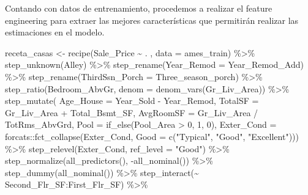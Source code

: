 \documentclass[
]{book}
\newenvironment{Shaded}{\begin{snugshade}}{\end{snugshade}}
\newcommand{\AttributeTok}[1]{\textcolor[rgb]{0.77,0.63,0.00}{#1}}
\newcommand{\DecValTok}[1]{\textcolor[rgb]{0.00,0.00,0.81}{#1}}
\newcommand{\FunctionTok}[1]{\textcolor[rgb]{0.00,0.00,0.00}{#1}}
\newcommand{\NormalTok}[1]{#1}
\newcommand{\OtherTok}[1]{\textcolor[rgb]{0.56,0.35,0.01}{#1}}
\newcommand{\SpecialCharTok}[1]{\textcolor[rgb]{0.00,0.00,0.00}{#1}}
\newcommand{\StringTok}[1]{\textcolor[rgb]{0.31,0.60,0.02}{#1}}
\begin{document}
Contando con datos de entrenamiento, procedemos a realizar el feature engineering para extraer las mejores características que permitirán realizar las estimaciones en el modelo.

\begin{Shaded}
\begin{Highlighting}[]
\NormalTok{receta\_casas }\OtherTok{\textless{}{-}} \FunctionTok{recipe}\NormalTok{(Sale\_Price }\SpecialCharTok{\textasciitilde{}}\NormalTok{ . , }\AttributeTok{data =}\NormalTok{ ames\_train) }\SpecialCharTok{\%\textgreater{}\%}
  \FunctionTok{step\_unknown}\NormalTok{(Alley) }\SpecialCharTok{\%\textgreater{}\%}
  \FunctionTok{step\_rename}\NormalTok{(}\AttributeTok{Year\_Remod =}\NormalTok{ Year\_Remod\_Add) }\SpecialCharTok{\%\textgreater{}\%} 
  \FunctionTok{step\_rename}\NormalTok{(}\AttributeTok{ThirdSsn\_Porch =}\NormalTok{ Three\_season\_porch) }\SpecialCharTok{\%\textgreater{}\%} 
  \FunctionTok{step\_ratio}\NormalTok{(Bedroom\_AbvGr, }\AttributeTok{denom =} \FunctionTok{denom\_vars}\NormalTok{(Gr\_Liv\_Area)) }\SpecialCharTok{\%\textgreater{}\%} 
  \FunctionTok{step\_mutate}\NormalTok{(}
    \AttributeTok{Age\_House =}\NormalTok{ Year\_Sold }\SpecialCharTok{{-}}\NormalTok{ Year\_Remod,}
    \AttributeTok{TotalSF   =}\NormalTok{ Gr\_Liv\_Area }\SpecialCharTok{+}\NormalTok{ Total\_Bsmt\_SF,}
    \AttributeTok{AvgRoomSF   =}\NormalTok{ Gr\_Liv\_Area }\SpecialCharTok{/}\NormalTok{ TotRms\_AbvGrd,}
    \AttributeTok{Pool =} \FunctionTok{if\_else}\NormalTok{(Pool\_Area }\SpecialCharTok{\textgreater{}} \DecValTok{0}\NormalTok{, }\DecValTok{1}\NormalTok{, }\DecValTok{0}\NormalTok{),}
    \AttributeTok{Exter\_Cond =}\NormalTok{ forcats}\SpecialCharTok{::}\FunctionTok{fct\_collapse}\NormalTok{(Exter\_Cond, }\AttributeTok{Good =} \FunctionTok{c}\NormalTok{(}\StringTok{"Typical"}\NormalTok{, }\StringTok{"Good"}\NormalTok{, }\StringTok{"Excellent"}\NormalTok{))) }\SpecialCharTok{\%\textgreater{}\%} 
  \FunctionTok{step\_relevel}\NormalTok{(Exter\_Cond, }\AttributeTok{ref\_level =} \StringTok{"Good"}\NormalTok{) }\SpecialCharTok{\%\textgreater{}\%} 
  \FunctionTok{step\_normalize}\NormalTok{(}\FunctionTok{all\_predictors}\NormalTok{(), }\SpecialCharTok{{-}}\FunctionTok{all\_nominal}\NormalTok{()) }\SpecialCharTok{\%\textgreater{}\%}
  \FunctionTok{step\_dummy}\NormalTok{(}\FunctionTok{all\_nominal}\NormalTok{()) }\SpecialCharTok{\%\textgreater{}\%} 
  \FunctionTok{step\_interact}\NormalTok{(}\SpecialCharTok{\textasciitilde{}}\NormalTok{ Second\_Flr\_SF}\SpecialCharTok{:}\NormalTok{First\_Flr\_SF) }\SpecialCharTok{\%\textgreater{}\%} 

\end{Highlighting}
\end{Shaded}
\end{document}

